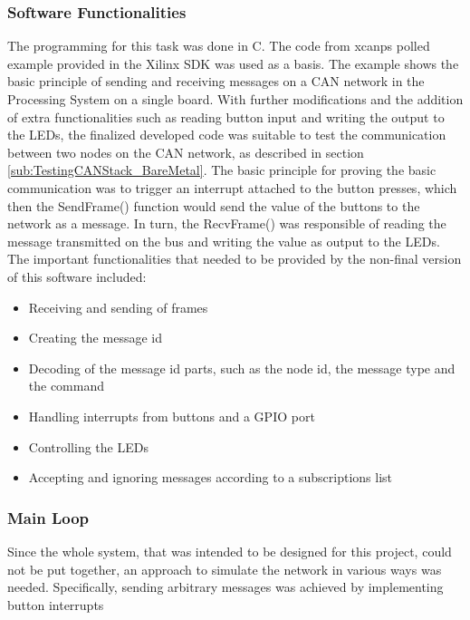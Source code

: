 \subsubsection*{Software Functionalities}\label{sub:Basic_SourceCode}
The programming for this task was done in C.
The code from xcanps polled example provided in the Xilinx SDK was used as a basis.
The example shows the basic principle of sending and receiving messages on a CAN network in the Processing System on a single board.
With further modifications and the addition of extra functionalities such as reading button input and writing the output to the LEDs, the finalized developed code was suitable to test the communication between two nodes on the CAN network, as described in section \ref{sub:TestingCANStack_BareMetal}.
The basic principle for proving the basic communication was to trigger an interrupt attached to the button presses, which then the SendFrame() function would send the value of the buttons to the network as a message.
In turn, the RecvFrame() was responsible of reading the message transmitted on the bus and writing the value as output to the LEDs.
The important functionalities that needed to be provided by the non-final version of this software included:
\begin{itemize}
\item Receiving and sending of frames
\item Creating the message id
\item Decoding of the message id parts, such as the node id, the message type and the command
\item Handling interrupts from buttons and a GPIO port
\item Controlling the LEDs
\item Accepting and ignoring messages according to a subscriptions list
\end{itemize}

\subsubsection*{Main Loop}
Since the whole system, that was intended to be designed for this project, could not be put together, an approach to simulate the network in various ways was needed.
Specifically, sending arbitrary messages was achieved by implementing button interrupts

